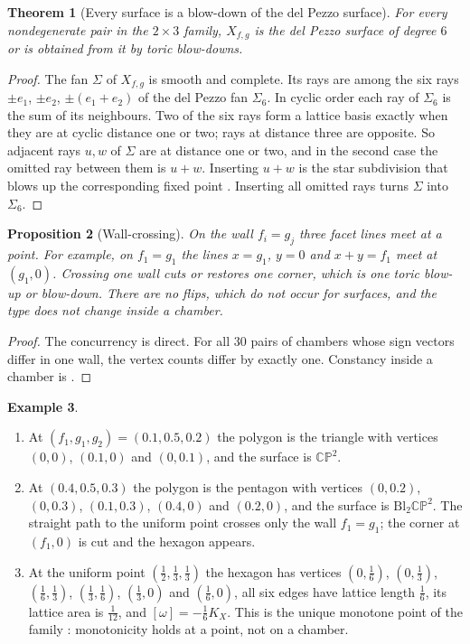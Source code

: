 \documentclass[11pt]{article}
\newtheorem{theorem}{Theorem}[section]
\newtheorem{proposition}[theorem]{Proposition}
\theoremstyle{definition}
\newtheorem{example}[theorem]{Example}
\theoremstyle{remark}
\newcommand{\CP}{\mathbb{CP}}
\begin{document}
\begin{theorem}[Every surface is a blow-down of the del Pezzo surface]\label{thm:blowdown}
For every nondegenerate pair in the $2\times3$ family, $X_{f,g}$ is the del Pezzo surface of degree $6$ or
is obtained from it by toric blow-downs.
\end{theorem}
\begin{proof}
The fan $\Sigma$ of $X_{f,g}$ is smooth and complete. Its rays are among the six rays
$\pm e_1$, $\pm e_2$, $\pm(e_1+e_2)$ of the del Pezzo fan $\Sigma_6$. In cyclic order each ray of $\Sigma_6$ is the
sum of its neighbours. Two of the six rays form a lattice basis exactly when they are at
cyclic distance one or two; rays at distance three are opposite. So adjacent rays $u,w$ of $\Sigma$ are at
distance one or two, and in the second case the omitted ray between them is $u+w$. Inserting $u+w$ is
the star subdivision that blows up the corresponding fixed point \cite{Fulton1993}. Inserting all
omitted rays turns $\Sigma$ into $\Sigma_6$.
\end{proof}

\begin{proposition}[Wall-crossing]\label{prop:wall}
On the wall $f_i=g_j$ three facet lines meet at a point. For example, on $f_1=g_1$ the lines $x=g_1$,
$y=0$ and $x+y=f_1$ meet at $(g_1,0)$. Crossing one wall cuts or restores one corner, which is one toric
blow-up or blow-down. There are no flips, which do not occur for surfaces, and the type does not change
inside a chamber.
\end{proposition}
\begin{proof}
The concurrency is direct. For all $30$ pairs of chambers whose sign vectors differ in one wall, the
vertex counts differ by exactly one. Constancy inside a chamber is \cite[Prop.~6.6]{Conditionals}.
\end{proof}

\begin{example}\label{ex:2x3}
\leavevmode
\begin{enumerate}[label=(\alph*),leftmargin=*]
\item At $(f_1,g_1,g_2)=(0.1,0.5,0.2)$ the polygon is the triangle with vertices $(0,0)$, $(0.1,0)$ and
  $(0,0.1)$, and the surface is $\CP^2$.
\item At $(0.4,0.5,0.3)$ the polygon is the pentagon with vertices $(0,0.2)$, $(0,0.3)$, $(0.1,0.3)$,
  $(0.4,0)$ and $(0.2,0)$, and the surface is $\mathrm{Bl}_2\CP^2$. The straight path to the uniform point
  crosses only the wall $f_1=g_1$; the corner at $(f_1,0)$ is cut and the hexagon appears.
\item At the uniform point $(\tfrac12,\tfrac13,\tfrac13)$ the hexagon has vertices $(0,\tfrac16)$, $(0,\tfrac13)$,
  $(\tfrac16,\tfrac13)$, $(\tfrac13,\tfrac16)$, $(\tfrac13,0)$ and $(\tfrac16,0)$, all six edges have lattice length
  $\tfrac16$, its lattice area is $\tfrac1{12}$, and $[\omega]=-\tfrac16K_X$. This is the unique monotone point of
  the family \cite[Prop.~6.7]{Conditionals}: monotonicity holds at a point, not on a chamber.
\end{enumerate}
\end{example}
\end{document}
